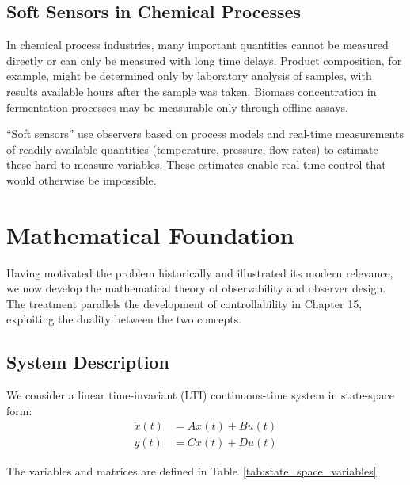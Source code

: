 \subsection{Soft Sensors in Chemical Processes}

In chemical process industries, many important quantities cannot be measured directly or can only be measured with long time delays. Product composition, for example, might be determined only by laboratory analysis of samples, with results available hours after the sample was taken. Biomass concentration in fermentation processes may be measurable only through offline assays.

``Soft sensors'' use observers based on process models and real-time measurements of readily available quantities (temperature, pressure, flow rates) to estimate these hard-to-measure variables. These estimates enable real-time control that would otherwise be impossible.

\section{Mathematical Foundation}

Having motivated the problem historically and illustrated its modern relevance, we now develop the mathematical theory of observability and observer design. The treatment parallels the development of controllability in Chapter 15, exploiting the duality between the two concepts.

\subsection{System Description}

We consider a linear time-invariant (LTI) continuous-time system in state-space form:
\begin{align}
\dot{x}(t) &= Ax(t) + Bu(t) \label{eq:state_equation}\\
y(t) &= Cx(t) + Du(t) \label{eq:output_equation}
\end{align}

The variables and matrices are defined in Table~\ref{tab:state_space_variables}.

